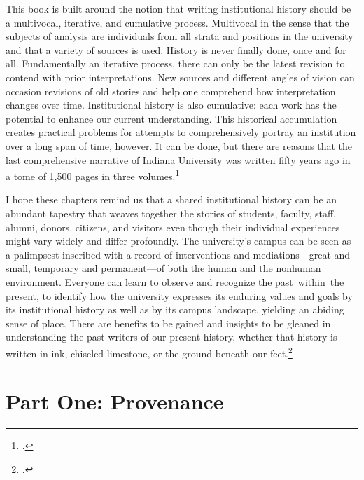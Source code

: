 \documentclass[
  american,
  letterpaper,
]{scrreprt}
\begin{document}
This book is built around the notion that writing institutional history
should be a multivocal, iterative, and cumulative process. Multivocal in
the sense that the subjects of analysis are individuals from all strata
and positions in the university and that a variety of sources is used.
History is never finally done, once and for all. Fundamentally an
iterative process, there can only be the latest revision to contend with
prior interpretations. New sources and different angles of vision can
occasion revisions of old stories and help one comprehend how
interpretation changes over time. Institutional history is also
cumulative: each work has the potential to enhance our current
understanding. This historical accumulation creates practical problems
for attempts to comprehensively portray an institution over a long span
of time, however. It can be done, but there are reasons that the last
comprehensive narrative of Indiana University was written fifty years
ago in a tome of 1,500 pages in three volumes.\footnote{.}

I hope these chapters remind us that a shared institutional history can
be an abundant tapestry that weaves together the stories of students,
faculty, staff, alumni, donors, citizens, and visitors even though their
individual experiences might vary widely and differ profoundly. The
university's campus can be seen as a palimpsest inscribed with a record
of interventions and mediations---great and small, temporary and
permanent---of both the human and the nonhuman environment. Everyone can
learn to observe and recognize the past~within~the present, to identify
how the university expresses its enduring values and goals by its
institutional history as well as by its campus landscape, yielding an
abiding sense of place. There are benefits to be gained and insights to
be gleaned in understanding the past writers of our present history,
whether that history is written in ink, chiseled limestone, or the
ground beneath our feet.\footnote{.}


\chapter*{Part One: Provenance}\label{sec-partone}
\end{document}
